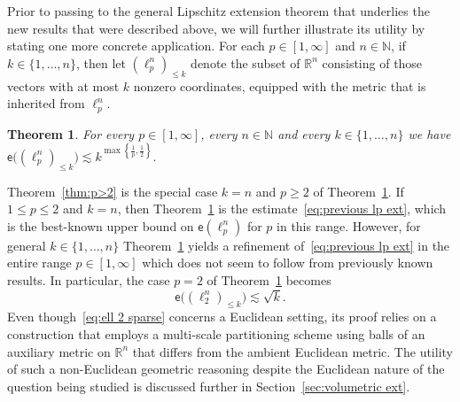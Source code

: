 \documentclass[11pt,reqno]{amsart}
\renewcommand{\le}{\leqslant}
\renewcommand{\ge}{\geqslant}
\newcommand{\n}{\{1,\ldots,n\}}
\newcommand{\R}{\mathbb R}
\newtheorem{theorem}{Theorem}
\theoremstyle{remark}
\newcommand{\N}{\mathbb N}
\newcommand{\ee}{\mathsf{e}}
\renewcommand{\1}{\mathbf 1}
\begin{document}
Prior to passing to the general Lipschitz extension theorem that underlies the new results that were described above, we will further illustrate its utility by stating one more concrete  application. For each $p\in [1,\infty]$ and $n\in \N$, if  $k\in \n$, then let $(\ell_p^n)_{\le k}$ denote the subset of $\R^n$ consisting of those vectors with at most $k$ nonzero coordinates, equipped with the metric that is inherited from $\ell_p^n$.
\begin{theorem}\label{thm:sparse} For every $p\in [1,\infty]$, every $n\in \N$ and every $k\in \n$ we have
$
\ee\big((\ell_p^n)_{\le k}\big)\lesssim  k^{\max\left\{\frac{1}{p},\frac12\right\}}.
$\end{theorem}



Theorem~\ref{thm:p>2}  is the special case $k=n$ and $p\ge 2$ of Theorem~\ref{thm:sparse}.  If $1\le p\le 2$ and $k=n$, then Theorem~\ref{thm:sparse}  is the estimate~\eqref{eq:previous lp ext}, which is the best-known upper bound on $\ee(\ell_p^n)$ for $p$ in this range. However, for general $k\in \n$ Theorem~\ref{thm:sparse}  yields a refinement of~\eqref{eq:previous lp ext}  in the entire range $p\in [1,\infty]$ which does not seem to follow from previously known results.  In particular, the case $p=2$ of Theorem~\ref{thm:sparse} becomes
\begin{equation}\label{eq:ell 2 sparse}
\ee\big((\ell_2^n)_{\le k}\big)\lesssim  \sqrt{k}.
\end{equation}
 Even though~\eqref{eq:ell 2 sparse}  concerns a  Euclidean setting, its proof relies on a   construction that employs a multi-scale partitioning scheme using balls of an auxiliary metric on $\R^n$ that differs from the ambient Euclidean metric. The utility of such a non-Euclidean geometric reasoning despite the Euclidean nature of the question being studied is  discussed further in Section~\ref{sec:volumetric ext}.
\end{document}
